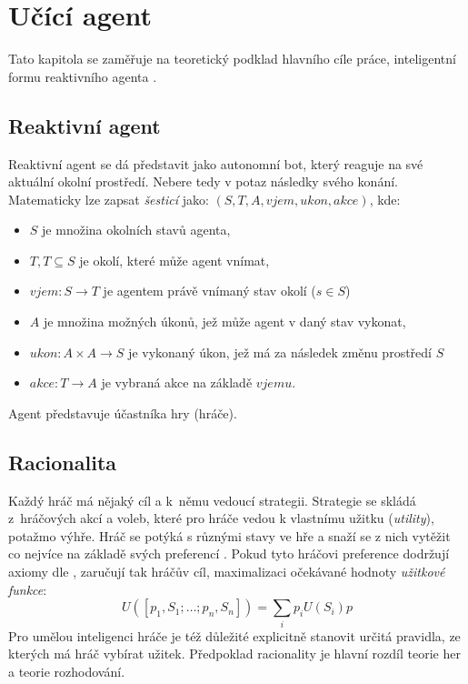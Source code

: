 \chapter{Učící agent}
Tato kapitola se zaměřuje na teoretický podklad hlavního cíle práce, inteligentní formu reaktivního agenta \cite{AI3}.
\section{Reaktivní agent}
Reaktivní agent se dá představit jako autonomní bot, který reaguje na své aktuální okolní prostředí. Nebere tedy v potaz následky svého konání. Matematicky lze zapsat \textit{šesticí} \cite{AI3} jako: $(S,T,A, vjem, ukon, akce)$, kde:
\begin{itemize}
\item $S$ je množina okolních stavů agenta,
\item $T, T\subseteq S$ je okolí, které může agent vnímat,
\item $vjem: S \to T$ je agentem právě vnímaný stav okolí ($s \in S$)
\item $A$ je množina možných úkonů, jež může agent v daný stav vykonat,
\item $ukon: A \times A \to S$ je vykonaný úkon, jež má za následek změnu prostředí $S$
\item $akce: T \to A$ je vybraná akce na základě $vjemu$.
\end{itemize}
Agent představuje účastníka hry (hráče).

\section{Racionalita}
\label{sec:racionalita}
Každý hráč má nějaký cíl a k němu vedoucí strategii. Strategie se skládá z hráčových akcí a voleb, které pro hráče vedou k vlastnímu užitku (\textit{utility}), potažmo výhře. Hráč se potýká s různými stavy ve hře a snaží se z nich vytěžit co nejvíce na základě svých preferencí \cite{berkeley}. Pokud tyto hráčovi preference dodržují axiomy dle \cite{mas}, zaručují tak hráčův cíl, maximalizaci očekávané hodnoty \textit{užitkové funkce}:
\begin{displaymath} 
U([p_1,S_1;\dots;p_n,S_n]) = \sum_{i}p_iU(S_i)p
\end{displaymath}
Pro umělou inteligenci hráče je též důležité explicitně stanovit určitá pravidla, ze kterých má hráč vybírat užitek. Předpoklad racionality je hlavní rozdíl teorie her a teorie rozhodování.

